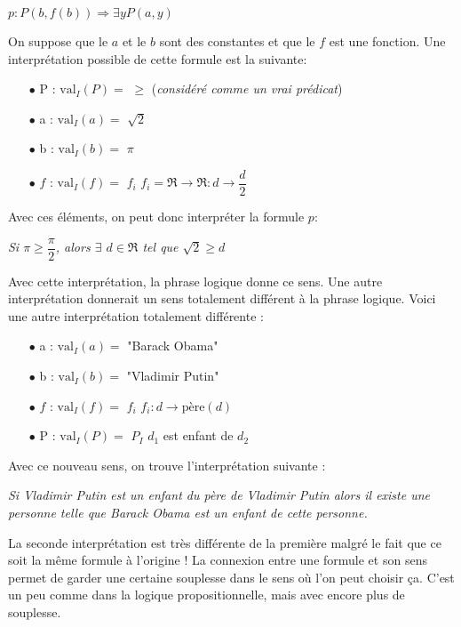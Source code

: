 \begin{center}
$p : P(b,f(b)) \Rightarrow \exists y   P(a,y)$  \\
\vspace{3mm}
\end{center}
On suppose que le $a$ et le $b$ sont des constantes et que le $f$ est une fonction.
Une interprétation possible de cette formule est la suivante:
\begin{itemize}
\item[$\bullet$]P : $\mathrm{val}_{I}(P) = $ $ \geq $ \hspace{3mm} (\textit{considéré comme un vrai prédicat})
\item[$\bullet$] a : $\mathrm{val}_{I}(a) = $ $ \sqrt{2} $ 
\item[$\bullet$] b : $\mathrm{val}_{I}(b) = $ $ \pi $ 
\item[$\bullet$] $f$ : $\mathrm{val}_{I}(f) = $ $ f_{i} $ \hspace{3mm} $f_{i}= \Re \rightarrow \Re : d \rightarrow \dfrac{d}{2} $ 
\end{itemize}
Avec ces éléments, on peut donc interpréter la formule $p$:
\begin{center}
\textit{Si $\pi \geq  \dfrac{\pi}{2}$, alors $\exists$ $ d \in \Re$ tel que $\sqrt2 \geq d$ }
\end{center}
Avec cette interprétation, la phrase logique donne ce sens.
Une autre interprétation donnerait un sens totalement différent à la phrase logique. Voici une autre interprétation totalement différente :
\begin{itemize}
\item[$\bullet$] a : $\mathrm{val}_{I}(a) = $ "Barack Obama"
\item[$\bullet$] b : $\mathrm{val}_{I}(b) = $ "Vladimir Putin"
\item[$\bullet$] $f$ : $\mathrm{val}_{I}(f) = $ $ f_{i} $ \hspace{3mm} $f_{i}: d \rightarrow \mathrm{père}(d)$
\item[$\bullet$] P :  $\mathrm{val}_{I}(P) = $ $P_{I}$ \hspace{3mm} $d_{1}$ est enfant de $d_{2}$\\
\end{itemize}

Avec ce nouveau sens, on trouve l'interprétation suivante : 
\begin{center}
\textit{Si Vladimir Putin est un enfant du père de Vladimir Putin alors il existe une personne telle que Barack Obama est un enfant de cette personne.}
\end{center}
La seconde interprétation est très différente de la première malgré le fait que ce soit la même formule à l'origine ! La connexion entre une formule et son sens permet de garder une certaine souplesse dans le sens où l'on peut choisir ça. C'est un peu comme dans la logique propositionnelle, mais avec encore plus de souplesse.

